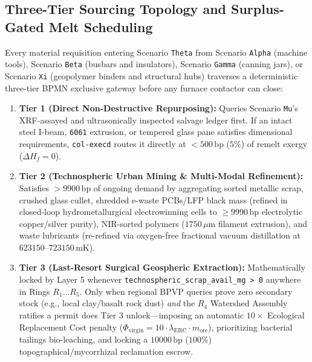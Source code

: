 \subsection{Three-Tier Sourcing Topology and Surplus-Gated Melt Scheduling}

Every material requisition entering Scenario \texttt{Theta} from Scenario \texttt{Alpha} (machine tools), Scenario \texttt{Beta} (busbars and
insulators), Scenario \texttt{Gamma} (canning jars), or Scenario \texttt{Xi} (geopolymer binders and structural hubs) traverses a deterministic
three-tier BPMN exclusive gateway before any furnace contactor can close:
\begin{enumerate}
    \item \textbf{Tier 1 (Direct Non-Destructive Repurposing):} Queries Scenario \texttt{Mu}'s XRF-assayed and ultrasonically inspected salvage
    ledger first. If an intact steel I-beam, \texttt{6061} extrusion, or tempered glass pane satisfies dimensional requirements,
    \texttt{col-execd} routes it directly at $< 500\,\mathrm{bp}$ ($5\%$) of remelt exergy ($\Delta H_f = 0$).
    \item \textbf{Tier 2 (Technospheric Urban Mining \& Multi-Modal Refinement):} Satisfies $> 9900\,\mathrm{bp}$ of ongoing demand by
    aggregating sorted metallic scrap, crushed glass cullet, shredded e-waste PCBs/LFP black mass (refined in closed-loop hydrometallurgical
    electrowinning cells to $\ge 9990\,\mathrm{bp}$ electrolytic copper/silver purity), NIR-sorted polymers ($1750\,\mu\mathrm{m}$ filament
    extrusion), and waste lubricants (re-refined via oxygen-free fractional vacuum distillation at $623150\text{--}723150\,\mathrm{mK}$).
    \item \textbf{Tier 3 (Last-Resort Surgical Geospheric Extraction):} Mathematically locked by Layer 5 whenever
    \texttt{technospheric\_scrap\_avail\_mg > 0} anywhere in Rings $R_1 \dots R_5$. Only when regional BPVP queries \parencite{rekhter2006} prove
    zero secondary stock (e.g., local clay/basalt rock dust) \emph{and} the $R_4$ Watershed Assembly ratifies a permit does Tier 3
    unlock---imposing an automatic $10\times$ Ecological Replacement Cost penalty
    ($\Phi_{\mathrm{virgin}} = 10 \cdot \lambda_{\mathrm{ERC}} \cdot m_{\mathrm{ore}}$), prioritizing bacterial tailings bio-leaching, and
    locking a $10000\,\mathrm{bp}$ ($100\%$) topographical/mycorrhizal reclamation escrow.
\end{enumerate}


